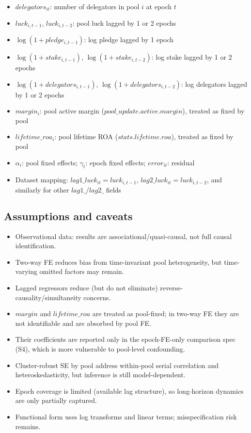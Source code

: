 \documentclass[11pt]{article}
\begin{document}
\begin{itemize}
\item $delegators_{it}$: number of delegators in pool $i$ at epoch $t$
\item $luck_{i,t-1}$, $luck_{i,t-2}$: pool luck lagged by 1 or 2 epochs
\item $\log(1+pledge_{i,t-1})$: log pledge lagged by 1 epoch
\item $\log(1+stake_{i,t-1})$, $\log(1+stake_{i,t-2})$: log stake lagged by 1 or 2 epochs
\item $\log(1+delegators_{i,t-1})$, $\log(1+delegators_{i,t-2})$: log delegators lagged by 1 or 2 epochs
\item $margin_i$: pool active margin ($pool\_update.active.margin$), treated as fixed by pool
\item $lifetime\_roa_i$: pool lifetime ROA ($stats.lifetime.roa$), treated as fixed by pool
\item $\alpha_i$: pool fixed effects; $\gamma_t$: epoch fixed effects; $error_{it}$: residual
\item Dataset mapping: $lag1\_luck_{it}=luck_{i,t-1}$, $lag2\_luck_{it}=luck_{i,t-2}$, and similarly for other $lag1\_$/$lag2\_$ fields
\end{itemize}
\subsection*{Assumptions and caveats}
\begin{itemize}
\item Observational data: results are associational/quasi-causal, not full causal identification.
\item Two-way FE reduces bias from time-invariant pool heterogeneity, but time-varying omitted factors may remain.
\item Lagged regressors reduce (but do not eliminate) reverse-causality/simultaneity concerns.
\item $margin$ and $lifetime\_roa$ are treated as pool-fixed; in two-way FE they are not identifiable and are absorbed by pool FE.
\item Their coefficients are reported only in the epoch-FE-only comparison spec (S4), which is more vulnerable to pool-level confounding.
\item Cluster-robust SE by pool address within-pool serial correlation and heteroskedasticity, but inference is still model-dependent.
\item Epoch coverage is limited (available lag structure), so long-horizon dynamics are only partially captured.
\item Functional form uses log transforms and linear terms; misspecification risk remains.
\end{itemize}
\end{document}
